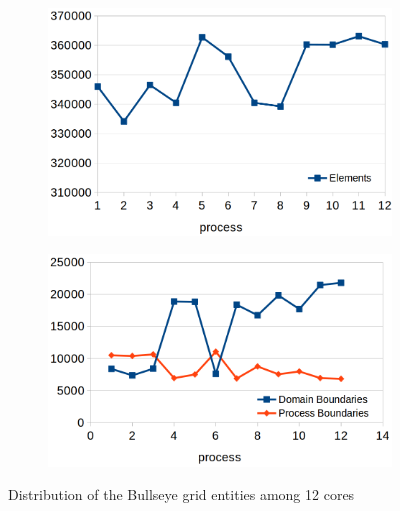 \begin{figure}
\centering
	\begin{subfigure}[b]{0.48\textwidth} \includegraphics[scale=0.20]{images/elemdistr} \end{subfigure}
	\begin{subfigure}[b]{0.48\textwidth} \includegraphics[scale=0.22]{images/boundarydistr} \end{subfigure}
\caption{Distribution of the Bullseye grid entities among 12 cores}
\label{fig:impl:storage:bullseyeelemdistr}
\end{figure}


